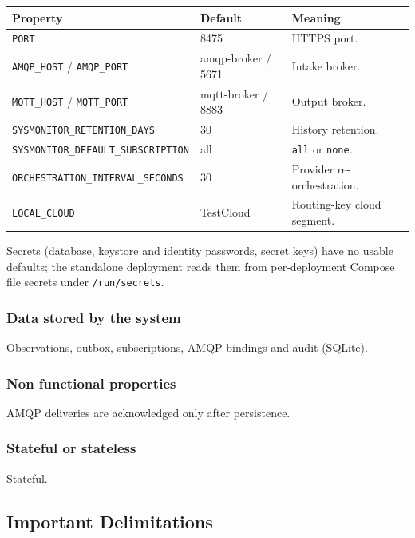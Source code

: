 \documentclass[a4paper]{arrowhead}
\begin{document}
\noindent\begin{longtable}{| p{5.4cm} | p{3.4cm} | p{6.4cm} |} \hline
\rowcolor{gray!33} Property & Default & Meaning \\ \hline \endhead
\texttt{PORT} & 8475 & HTTPS port. \\ \hline
\texttt{AMQP\_\allowbreak{}HOST} / \texttt{AMQP\_\allowbreak{}PORT} & amqp-broker / 5671 & Intake broker. \\ \hline
\texttt{MQTT\_\allowbreak{}HOST} / \texttt{MQTT\_\allowbreak{}PORT} & mqtt-broker / 8883 & Output broker. \\ \hline
\texttt{SYSMONITOR\_\allowbreak{}RETENTION\_\allowbreak{}DAYS} & 30 & History retention. \\ \hline
\texttt{SYSMONITOR\_\allowbreak{}DEFAULT\_\allowbreak{}SUBSCRIPTION} & all & \texttt{all} or \texttt{none}. \\ \hline
\texttt{ORCHESTRATION\_\allowbreak{}INTERVAL\_\allowbreak{}SECONDS} & 30 & Provider re-orchestration. \\ \hline
\texttt{LOCAL\_\allowbreak{}CLOUD} & TestCloud & Routing-key cloud segment. \\ \hline
\end{longtable}

Secrets (database, keystore and identity passwords, secret keys) have no usable defaults; the standalone deployment reads them from per-deployment Compose file secrets under \texttt{/\allowbreak{}run/\allowbreak{}secrets}.

\subsubsection{Data stored by the system}

Observations, outbox, subscriptions, AMQP bindings and audit (SQLite).

\subsubsection{Non functional properties}

AMQP deliveries are acknowledged only after persistence.

\subsubsection{Stateful or stateless}

Stateful.

\subsection{Important Delimitations}
\label{sec:delimitations}
\end{document}
